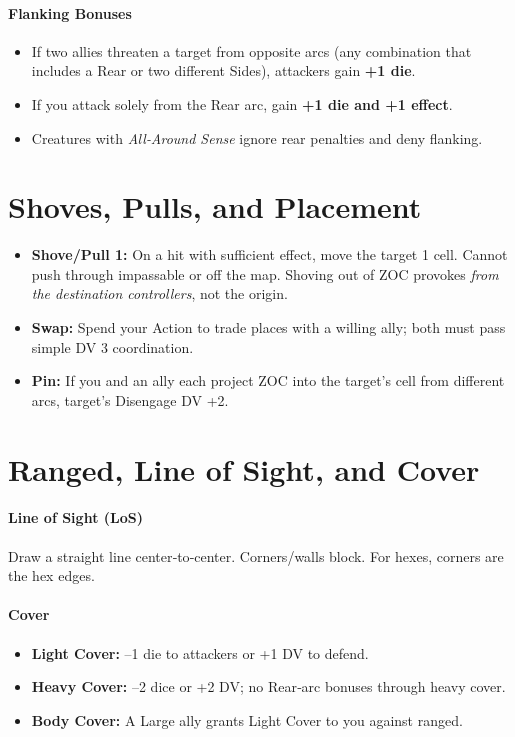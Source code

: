 \documentclass[11pt]{article}
\newcommand{\DV}{\textsc{DV}}
\begin{document}
\paragraph{Flanking Bonuses}
\begin{itemize}
  \item If two allies threaten a target from opposite arcs (any combination that includes a Rear or two different Sides), attackers gain \textbf{+1 die}.
  \item If you attack solely from the Rear arc, gain \textbf{+1 die and +1 effect}.
  \item Creatures with \emph{All‑Around Sense} ignore rear penalties and deny flanking.
\end{itemize}

\section{Shoves, Pulls, and Placement}
\begin{itemize}
  \item \textbf{Shove/Pull 1:} On a hit with sufficient effect, move the target 1 cell. Cannot push through impassable or off the map. Shoving out of ZOC provokes \emph{from the destination controllers}, not the origin.
  \item \textbf{Swap:} Spend your Action to trade places with a willing ally; both must pass simple \DV{} 3 coordination.
  \item \textbf{Pin:} If you and an ally each project ZOC into the target’s cell from different arcs, target’s Disengage \DV{} +2.
\end{itemize}

\section{Ranged, Line of Sight, and Cover}
\paragraph{Line of Sight (LoS)} Draw a straight line center‑to‑center. Corners/walls block. For hexes, corners are the hex edges.

\paragraph{Cover}
\begin{itemize}
  \item \textbf{Light Cover:} –1 die to attackers or +1 \DV{} to defend.
  \item \textbf{Heavy Cover:} –2 dice or +2 \DV{}; no Rear‑arc bonuses through heavy cover.
  \item \textbf{Body Cover:} A Large ally grants Light Cover to you against ranged.
\end{itemize}
\end{document}
